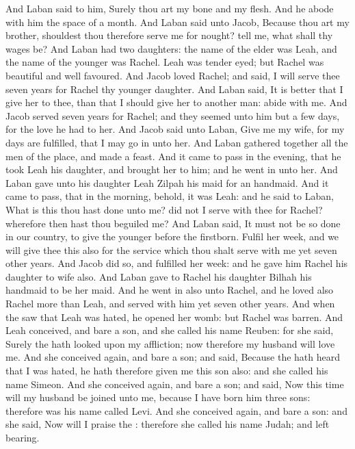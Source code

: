 \begin{biblechapter}
\verse And Laban said to him, Surely thou art my bone and my flesh. And he abode with him the space of a month.
 And Laban said unto Jacob, Because thou art my brother, shouldest thou therefore serve me for nought? tell me, what shall thy wages be?
\verse And Laban had two daughters: the name of the elder was Leah, and the name of the younger was Rachel.
\verse Leah was tender eyed; but Rachel was beautiful and well favoured.
\verse And Jacob loved Rachel; and said, I will serve thee seven years for Rachel thy younger daughter.
\verse And Laban said, It is better that I give her to thee, than that I should give her to another man: abide with me.
\verse And Jacob served seven years for Rachel; and they seemed unto him but a few days, for the love he had to her.
\verse And Jacob said unto Laban, Give me my wife, for my days are fulfilled, that I may go in unto her.
\verse And Laban gathered together all the men of the place, and made a feast.
\verse And it came to pass in the evening, that he took Leah his daughter, and brought her to him; and he went in unto her.
\verse And Laban gave unto his daughter Leah Zilpah his maid for an handmaid.
\verse And it came to pass, that in the morning, behold, it was Leah: and he said to Laban, What is this thou hast done unto me? did not I serve with thee for Rachel? wherefore then hast thou beguiled me?
\verse And Laban said, It must not be so done in our country, to give the younger before the firstborn.
\verse Fulfil her week, and we will give thee this also for the service which thou shalt serve with me yet seven other years.
\verse And Jacob did so, and fulfilled her week: and he gave him Rachel his daughter to wife also.
\verse And Laban gave to Rachel his daughter Bilhah his handmaid to be her maid.
\verse And he went in also unto Rachel, and he loved also Rachel more than Leah, and served with him yet seven other years.
 And when the \LORD saw that Leah was hated, he opened her womb: but Rachel was barren.
\verse And Leah conceived, and bare a son, and she called his name Reuben: for she said, Surely the \LORD hath looked upon my affliction; now therefore my husband will love me.
\verse And she conceived again, and bare a son; and said, Because the \LORD hath heard that I was hated, he hath therefore given me this son also: and she called his name Simeon.
\verse And she conceived again, and bare a son; and said, Now this time will my husband be joined unto me, because I have born him three sons: therefore was his name called Levi.
\verse And she conceived again, and bare a son: and she said, Now will I praise the \LORD: therefore she called his name Judah; and left bearing.
\end{biblechapter}


